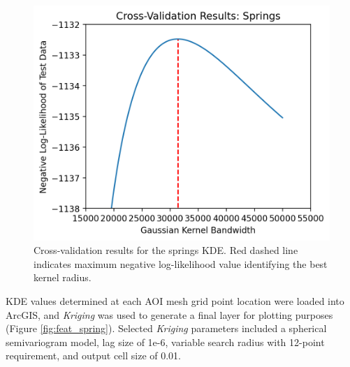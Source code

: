 \begin{figure}[H]
\centering
\includegraphics[scale=.60]{templates/images/Figure-Springs_kde_gridsearchcv_result.png}
\singlespacing
\caption[Spring density parameter tuning]{Cross-validation results for the springs KDE. Red dashed line indicates maximum negative log-likelihood value identifying the best kernel radius.}
\label{fig:spring_cv}
\end{figure}

KDE values determined at each AOI mesh grid point location were loaded into ArcGIS, and \textit{Kriging} was used to generate a final layer for plotting purposes (Figure \ref{fig:feat_spring}). Selected \textit{Kriging} parameters included a spherical semivariogram model, lag size of 1e-6, variable search radius with 12-point requirement, and output cell size of 0.01.
\vfill
\pagebreak

